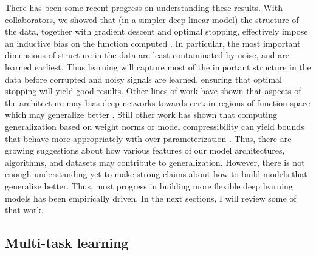 There has been some recent progress on understanding these results. With collaborators, we showed that (in a simpler deep linear model) the structure of the data, together with gradient descent and optimal stopping, effectively impose an inductive bias on the function computed \citep{Lampinen2019}. In particular, the most important dimensions of structure in the data are least contaminated by noise, and are learned earliest. Thus learning will capture most of the important structure in the data before corrupted and noisy signals are learned, ensuring that optimal stopping will yield good results. Other lines of work have shown that aspects of the architecture may bias deep networks towards certain regions of function space which may generalize better \citep{Perez2019}. Still other work has shown that computing generalization based on weight norms or model compressibility can yield bounds that behave more appropriately with over-parameterization \citep{Neyshabur2018,Arora2018}. Thus, there are growing suggestions about how various features of our model architectures, algorithms, and datasets may contribute to generalization. However, there is not enough understanding yet to make strong claims about how to build models that generalize better. Thus, most progress in building more flexible deep learning models has been empirically driven. In the next sections, I will review some of that work. 

\subsection{Multi-task learning}

